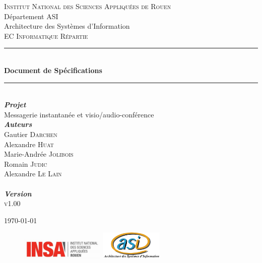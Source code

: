 \documentclass[11pt,dvipsnames,svgnames]{report}
\begin{document}
\begin{titlepage}
\newcommand{\HRule}{\rule{\linewidth}{0.5mm}} 
\center 
{}\textsc{\huge Institut National des Sciences Appliquées de Rouen}\\[0.7cm] 
\LARGE Département ASI~\\[0.5cm]
\Large{Architecture des Systèmes d'Information} ~\\[1.5cm]
\textsc{\Large EC Informatique Répartie}\\[0.5cm] 

\HRule \\[0.4cm]
{ \huge \bfseries Document de Spécifications}\\[0.18cm] \HRule \\[1.5cm]
 
\LARGE \emph{\textbf{Projet}} \\
{Messagerie instantanée et visio/audio-conférence}\\[1.3cm]

\large
	\emph{\textbf{Auteurs}}\\
	Gautier \textsc{Darchen} \\ 
	Alexandre \textsc{Huat} \\ 
	Marie-Andrée \textsc{Jolibois} \\ 
	Romain \textsc{Judic} \\ 
	Alexandre \textsc{Le Lain}\\[0.3cm]
	
~\\[0.5cm]
\Large \emph{\textbf{Version}}\\
	\textsc{v1.00}

\vfill{\today} 

\begin{figure}
\includegraphics[width=4cm]{images/LogoINSA.png}\hfill
\includegraphics[width=3cm]{images/logoasi.png}
\end{figure}


 \end{titlepage}
\end{document}

